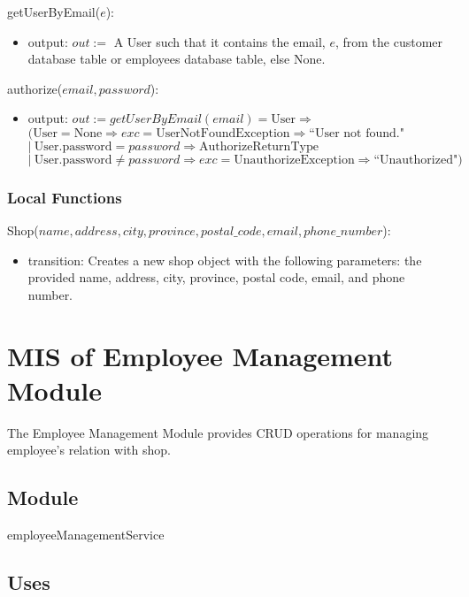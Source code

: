 \documentclass[12pt, titlepage]{article}
\begin{document}
\noindent getUserByEmail($e$):
\begin{itemize}
	\item output: $out :=$ A User such that it contains the email, $e$, from the customer database table or
	      employees database table, else None.
\end{itemize}

\noindent authorize($email, password$):
\begin{itemize}
	\item output: $out := getUserByEmail(email) = \text{User} \Rightarrow $ \\ $(\text{User} = \text{None}
		      \Rightarrow exc = \text{UserNotFoundException} \Rightarrow \text{``User not found."}$ \\ $|\
		      \text{User.password} = password \Rightarrow \text{AuthorizeReturnType}$ \\ $|\ \text{User.password}
		      \neq password \Rightarrow exc = \text{UnauthorizeException} \Rightarrow \text{``Unauthorized"})$
\end{itemize}

\subsubsection{Local Functions}

\noindent Shop($name, address, city, province, postal\_code, email, phone\_number$):
\begin{itemize}
	\item transition: Creates a new shop object with the following parameters: the provided name, address,
	      city, province, postal code, email, and phone number.
\end{itemize}

\newpage

\section{MIS of Employee Management Module} \label{mEmployeeManagement}

The Employee Management Module provides CRUD operations for managing employee’s relation with shop.

\subsection{Module}

employeeManagementService

\subsection{Uses}
\end{document}
